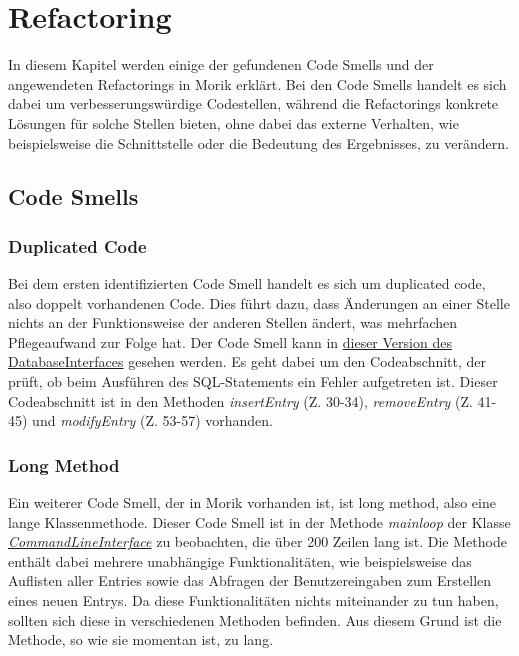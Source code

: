 \chapter{Refactoring}
\label{chap:refactoring}
In diesem Kapitel werden einige der gefundenen Code Smells und der angewendeten Refactorings in Morik erklärt. Bei den Code Smells handelt es sich dabei um verbesserungswürdige Codestellen, während die Refactorings konkrete Lösungen für solche Stellen bieten, ohne dabei das externe Verhalten, wie beispielsweise die Schnittstelle oder die Bedeutung des Ergebnisses, zu verändern.

\section{Code Smells}
\subsection{Duplicated Code}
Bei dem ersten identifizierten Code Smell handelt es sich um duplicated code, also doppelt vorhandenen Code. Dies führt dazu, dass Änderungen an einer Stelle nichts an der Funktionsweise der anderen Stellen ändert, was mehrfachen Pflegeaufwand zur Folge hat. Der Code Smell kann in \href{https://github.com/moorts/Morik/blob/8c90c65347f25b5a5a26f68c66189984dfb0bca6/src/adapters/database/DatabaseInterface.cpp}{dieser Version des DatabaseInterfaces} gesehen werden. Es geht dabei um den Codeabschnitt, der prüft, ob beim Ausführen des SQL-Statements ein Fehler aufgetreten ist. Dieser Codeabschnitt ist in den Methoden \textit{insertEntry} (Z. 30-34), \textit{removeEntry} (Z. 41-45) und \textit{modifyEntry} (Z. 53-57) vorhanden.

\subsection{Long Method}
Ein weiterer Code Smell, der in Morik vorhanden ist, ist long method, also eine lange Klassenmethode. Dieser Code Smell ist in der Methode \textit{mainloop} der Klasse \href{https://github.com/moorts/Morik/blob/main/src/plugins/ui/CommandLineInterface.cpp}{\textit{CommandLineInterface}} zu beobachten, die über 200 Zeilen lang ist. Die Methode enthält dabei mehrere unabhängige Funktionalitäten, wie beispielsweise das Auflisten aller Entries sowie das Abfragen der Benutzereingaben zum Erstellen eines neuen Entrys. Da diese Funktionalitäten nichts miteinander zu tun haben, sollten sich diese in verschiedenen Methoden befinden. Aus diesem Grund ist die Methode, so wie sie momentan ist, zu lang.

